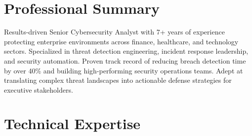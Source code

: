 \documentclass[11pt,a4paper]{article}
\newcommand{\cvcontact}[2]{\small\textcolor{white}{#1}\ \textcolor{white}{#2}}
\begin{document}
\noindent
{}

\vspace{10pt}

\section{Professional Summary}

Results-driven Senior Cybersecurity Analyst with 7+ years of experience protecting enterprise environments across finance, healthcare, and technology sectors. Specialized in threat detection engineering, incident response leadership, and security automation. Proven track record of reducing breach detection time by over 40\% and building high-performing security operations teams. Adept at translating complex threat landscapes into actionable defense strategies for executive stakeholders.

\section{Technical Expertise}

\vspace{4pt}
\end{document}
